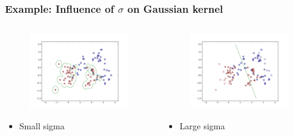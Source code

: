 \begin{frame}
	\frametitle{Example: Influence of $\sigma$ on Gaussian kernel}
	\begin{columns}
		\begin{column}{6cm}
			\begin{figure}
				\centering
				\includegraphics[width=6cm]{images/smallSigma.png}
			\end{figure}
			\begin{itemize}
				\item Small sigma
			\end{itemize}
		\end{column}
		\begin{column}{6cm}
			\begin{figure}
				\centering
				\includegraphics[width=6cm]{images/largeSigma.png}
			\end{figure}
			\begin{itemize}
				\item Large sigma
			\end{itemize}
		\end{column}
	\end{columns}
\end{frame}

